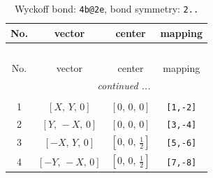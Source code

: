 \documentclass[fleqn,8pt]{jsarticle}
\begin{document}
\renewcommand{\arraystretch}{1.2}
\begin{longtable}{cccc}
\caption{Wyckoff bond: {\tt 4b@2e}, bond symmetry: {\tt 2..}}
 \\
 \hline \hline
No. & vector & center & mapping \\ \hline \endfirsthead

\multicolumn{3}{l}{\tablename\ \thetable{}} \\
 \hline \hline
No. & vector & center & mapping \\ \hline \endhead

 \hline \hline
\multicolumn{3}{r}{\footnotesize\it continued ...} \\ \endfoot

 \hline \hline
\multicolumn{3}{r}{} \\ \endlastfoot

1 & $\left[ X,\, Y,\, 0 \right]$ & $\left[ 0,\, 0,\, 0 \right]$ & {\tt [1,-2]} \\ \hline
2 & $\left[ Y,\, - X,\, 0 \right]$ & $\left[ 0,\, 0,\, 0 \right]$ & {\tt [3,-4]} \\ \hline
3 & $\left[ - X,\, Y,\, 0 \right]$ & $\left[ 0,\, 0,\, \frac{1}{2} \right]$ & {\tt [5,-6]} \\ \hline
4 & $\left[ - Y,\, - X,\, 0 \right]$ & $\left[ 0,\, 0,\, \frac{1}{2} \right]$ & {\tt [7,-8]} \\
\end{longtable}
\renewcommand{\arraystretch}{1.2}
\end{document}
